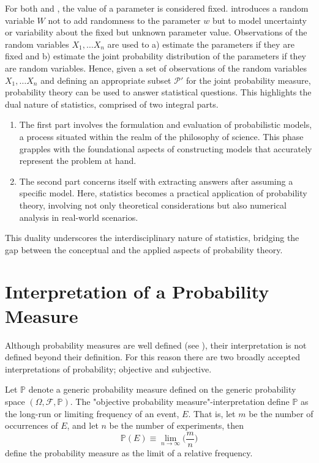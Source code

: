 For both  and , the value of a parameter is considered fixed.  introduces a random variable $W$ not to add randomness to the parameter $w$ but to model uncertainty or variability about the fixed but unknown parameter value. Observations of the random variables $X_1,\dots X_n$ are used to a) estimate the parameters if they are fixed and b) estimate the joint probability distribution of the parameters if they are random variables. Hence, given a set of observations of the random variables $X_1,\dots X_n$ and defining an appropriate subset $\mathcal{P}'$ for the joint probability measure, probability theory can be used to answer statistical questions. This highlights the dual nature of statistics, comprised of two integral parts.
\begin{enumerate}
	\item The first part involves the formulation and evaluation of probabilistic models, a process situated within the realm of the philosophy of science. This phase grapples with the foundational aspects of constructing models that accurately represent the problem at hand.
	\item The second part concerns itself with extracting answers after assuming a specific model. Here, statistics becomes a practical application of probability theory, involving not only theoretical considerations but also numerical analysis in real-world scenarios.
\end{enumerate}
This duality underscores the interdisciplinary nature of statistics, bridging the gap between the conceptual and the applied aspects of probability theory.  

\section{Interpretation of a Probability Measure} 
Although probability measures are well defined (see ), their interpretation is not defined beyond their definition. For this reason there are two broadly accepted interpretations of probability; objective and subjective. 

\begin{definition}
	\label{def:objective_probability}
	Let $\mathbb{P}$ denote a generic probability measure defined on the generic probability space $(\Omega,\mathcal{F},\mathbb{P})$. The "objective probability measure"-interpretation define $\mathbb{P}$ as the long-run or limiting frequency of an event, $E$. That is, let $m$ be the number of occurrences of $E$, and let $n$ be the number of experiments, then~\cite{Leamer1978}
	\begin{equation}
		\mathbb{P}(E) \equiv \lim_{{n \to \infty}} \bigg(\frac{m}{n}\bigg)
	\end{equation}
	define the probability measure as the limit of a relative frequency.
\end{definition}

